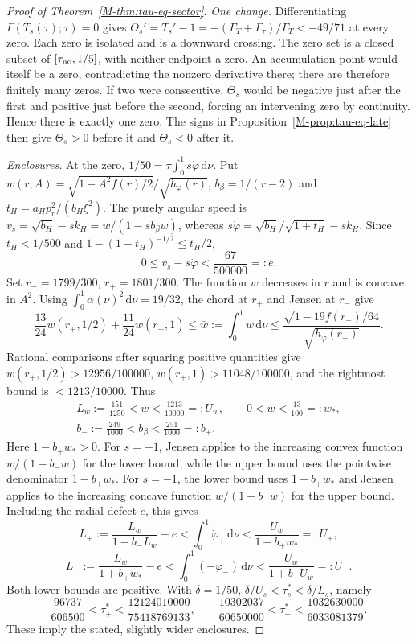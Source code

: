 \documentclass[aip,jmp,amsmath,amssymb,reprint]{revtex4-2}
\newcommand{\dd}{\mathrm{d}}
\theoremstyle{plain}
\theoremstyle{definition}
\begin{document}
\begin{proof}[Proof of Theorem~\ref{M-thm:tau-eq-sector}]
\emph{One change.} Differentiating $\Gamma(T_s(\tau);\tau)=0$ gives
$\Theta_s'=T_s'-1=-(\Gamma_T+\Gamma_\tau)/\Gamma_T<-49/71$ at every zero.
Each zero is isolated and is a downward crossing. The zero set is a closed
subset of $[\tau_{\rm no},1/5]$, with neither endpoint a zero.
An accumulation point would itself be a zero, contradicting the nonzero derivative there;
there are therefore finitely many zeros. If two were consecutive,
$\Theta_s$ would be negative just after the first and positive just before the second,
forcing an intervening zero by continuity. Hence there is exactly one zero.
The signs in Proposition~\ref{M-prop:tau-eq-late} then give
$\Theta_s>0$ before it and $\Theta_s<0$ after it.

\emph{Enclosures.} At the zero, $1/50=\tau\int_0^1s\dot\varphi\,\dd \nu$.
Put $w(r,A)=\sqrt{1-A^2f(r)/2}/\sqrt{h_\varphi(r)}$,
$b_\beta=1/(r-2)$ and $t_H=a_Hp_r^2/(b_H\xi^2)$.
The purely angular speed is $v_s=\sqrt{b_H}-sk_H=w/(1-sb_\beta w)$,
whereas $s\dot\varphi=\sqrt{b_H}/\sqrt{1+t_H}-sk_H$.
Since $t_H<1/500$ and $1-(1+t_H)^{-1/2}\le t_H/2$,
\[
 0\le v_s-s\dot\varphi<\frac{67}{500000}=:e.
\]
Set $r_-=1799/300$, $r_+=1801/300$.
The function $w$ decreases in $r$ and is concave in $A^2$.
Using $\int_0^1\alpha(\nu)^2\,\dd \nu=19/32$, the chord at $r_+$ and Jensen at $r_-$ give
\[
 \frac{13}{24}w(r_+,1/2)+\frac{11}{24}w(r_+,1)
 \le\bar w:=\int_0^1w\,\dd \nu
 \le\frac{\sqrt{1-19f(r_-)/64}}{\sqrt{h_\varphi(r_-)}}.
\]
Rational comparisons after squaring positive quantities give
$w(r_+,1/2)>12956/100000$, $w(r_+,1)>11048/100000$,
and the rightmost bound is $<1213/10000$. Thus
\[
 \begin{array}{l}
 \displaystyle L_w:=\frac{151}{1250}<\bar w<\frac{1213}{10000}=:U_w,\qquad
 0<w<\frac{13}{100}=:w_*,\\[8pt]
 \displaystyle b_-:=\frac{249}{1000}<b_\beta<\frac{251}{1000}=:b_+.
 \end{array}
\]
Here $1-b_+w_*>0$. For $s=+1$, Jensen applies to the increasing convex
function $w/(1-b_-w)$ for the lower bound, while the upper bound uses the
pointwise denominator $1-b_+w_*$. For $s=-1$, the lower bound uses
$1+b_+w_*$ and Jensen applies to the increasing concave function
$w/(1+b_-w)$ for the upper bound. Including the radial defect $e$, this gives
\[
 L_+:=\frac{L_w}{1-b_-L_w}-e
 <\int_0^1\dot\varphi_+\,\dd \nu
 <\frac{U_w}{1-b_+w_*}=:U_+,
\]
\[
 L_-:=\frac{L_w}{1+b_+w_*}-e
 <\int_0^1(-\dot\varphi_-)\,\dd \nu
 <\frac{U_w}{1+b_-U_w}=:U_-.
\]
Both lower bounds are positive. With $\delta=1/50$,
$\delta/U_s<\tau_s^*<\delta/L_s$, namely
\[
 \frac{96737}{606500}<\tau_+^*<\frac{12124010000}{75418769133},\qquad
 \frac{10302037}{60650000}<\tau_-^*<\frac{1032630000}{6033081379}.
\]
These imply the stated, slightly wider enclosures.
\end{proof}
\end{document}
